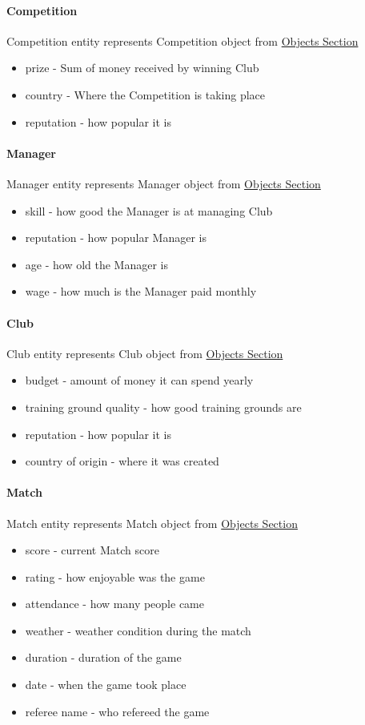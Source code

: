 \documentclass{report}
\begin{document}
\paragraph{Competition}
Competition entity represents Competition object from \hyperref[Objects Section]{Objects Section}
\begin{itemize}
    \item prize - Sum of money received by winning Club
    \item country - Where the Competition is taking place
    \item reputation - how popular it is
\end{itemize}


\paragraph{Manager}
Manager entity represents Manager object from \hyperref[Objects Section]{Objects Section}
\begin{itemize}
    \item skill - how good the Manager is at managing Club
    \item reputation - how popular Manager is
    \item age - how old the Manager is
    \item wage - how much is the Manager paid monthly
\end{itemize}


\paragraph{Club}
Club entity represents Club object from \hyperref[Objects Section]{Objects Section}
\begin{itemize}
    \item budget - amount of money it can spend yearly
    \item training ground quality - how good training grounds are
    \item reputation - how popular it is
    \item country of origin - where it was created
\end{itemize}


\paragraph{Match}
Match entity represents Match object from \hyperref[Objects Section]{Objects Section}
\begin{itemize}
    \item score - current Match score
    \item rating - how enjoyable was the game
    \item attendance - how many people came
    \item weather - weather condition during the match
    \item duration - duration of the game
    \item date - when the game took place
    \item referee name - who refereed the game
\end{itemize}
\end{document}
